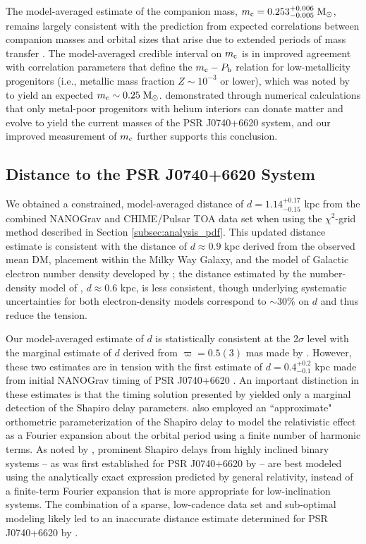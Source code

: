 \documentclass[twocolumn]{aastex63}
\newcommand{\chimepsr}{CHIME/Pulsar}
\begin{document}
The model-averaged estimate of the companion mass, $m_{\rm c} = 0.253^{+0.006}_{-0.005}\;{\rm M}_\odot$, remains largely consistent with the prediction from expected correlations between companion masses and orbital sizes that arise due to extended periods of mass transfer \citep{ts99}. The model-averaged credible interval on $m_{\rm c}$ is in improved agreement with correlation parameters that define the $m_{\rm c}-P_{\rm b}$ relation for low-metallicity progenitors (i.e., metallic mass fraction $Z \sim 10^{-3}$ or lower), which was noted by \citet{cfr+20} to yield an expected $m_{\rm c} \sim0.25\;{\rm M}_\odot$. \citet{enbd20} demonstrated through numerical calculations that only metal-poor progenitors with helium interiors can donate matter and evolve to yield the current masses of the PSR J0740+6620 system, and our improved measurement of $m_{\rm c }$ further supports this conclusion.

\subsection{Distance to the PSR J0740+6620 System}

We obtained a constrained, model-averaged distance of $d = 1.14^{+0.17}_{-0.15}$ kpc from the combined NANOGrav and \chimepsr{} TOA data set when using the $\chi^2$-grid method described in Section \ref{subsec:analysis_pdf}. This updated distance estimate is consistent with the distance of $d \approx 0.9$ kpc derived from the observed mean DM, placement within the Milky Way Galaxy, and the model of Galactic electron number density developed by \citet{ymw16}; the distance estimated by the number-density model of \citet{cl02}, $d \approx 0.6$ kpc, is less consistent, though underlying systematic uncertainties for both electron-density models correspond to $\sim 30$\% on $d$ and thus reduce the tension.

Our model-averaged estimate of $d$ is statistically consistent at the 2$\sigma$ level with the marginal estimate of $d$ derived from $\varpi = 0.5(3)$ mas made by \citet{cfr+20}. However, these two estimates are in tension with the first estimate of $d = 0.4^{+0.2}_{-0.1}$ kpc made from initial NANOGrav timing of PSR J0740+6620 \citep[derived from  $\varpi = 2.3(6)$;][]{abb+18}. An important distinction in these estimates is that the timing solution presented by \citet{abb+18} yielded only a marginal detection of the Shapiro delay parameters. \citet{abb+18} also employed an ``approximate" orthometric parameterization of the Shapiro delay to model the relativistic effect as a Fourier expansion about the orbital period using a finite number of harmonic terms. As noted by \citet{fw10}, prominent Shapiro delays from highly inclined binary systems -- as was first established for PSR J0740+6620 by \citet{cfr+20} -- are best modeled using the analytically exact expression predicted by general relativity, instead of a finite-term Fourier expansion that is more appropriate for low-inclination systems. The combination of a sparse, low-cadence data set and sub-optimal modeling likely led to an inaccurate distance estimate determined for PSR J0740+6620 by \citet{abb+18}.
\end{document}

